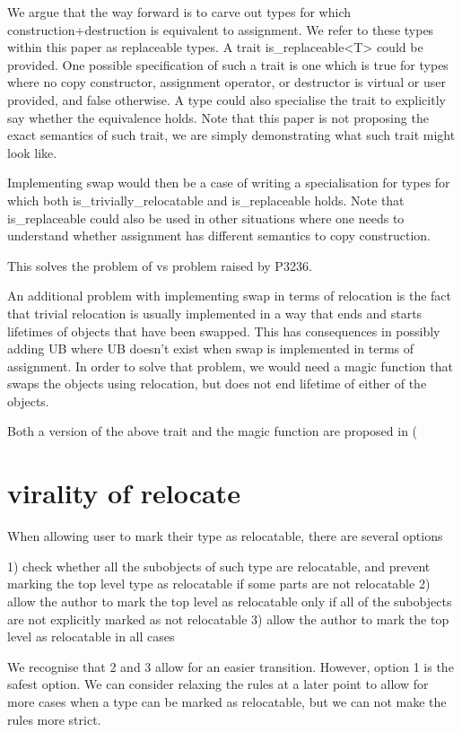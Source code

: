 \documentclass{wg21}
\begin{document}
We argue that the way forward is to carve out types for which construction+destruction is equivalent to assignment. We refer to these types within this paper as replaceable types. A trait is_replaceable<T> could be provided. One possible specification of such a trait is one which is true for types where no copy constructor, assignment operator, or destructor is virtual or user provided, and false otherwise. A type could also specialise the trait to explicitly say whether the equivalence holds. Note that this paper is not proposing the exact semantics of such trait, we are simply demonstrating what such trait might look like.


Implementing swap would then be a case of writing a specialisation for types for which both is_trivially_relocatable and is_replaceable holds. Note that is_replaceable could also be used in other situations where one needs to understand whether assignment has different semantics to copy construction.

This solves the problem of  vs  problem raised by P3236.

An additional problem with implementing swap in terms of relocation is the fact that trivial relocation is usually implemented in a way that ends and starts lifetimes of objects that have been swapped. This has consequences in possibly adding UB where UB doesn't exist when swap is implemented in terms of assignment. In order to solve that problem, we would need a magic function that swaps the objects using relocation, but does not end lifetime of either of the objects.

Both a version of the above trait and the magic function are proposed in (%


\section{virality of relocate}

When allowing user to mark their type as relocatable, there are several options

1) check whether all the subobjects of such type are relocatable, and prevent marking the top level type as relocatable if some parts are not relocatable
2) allow the author to mark the top level as relocatable only if all of the subobjects are not explicitly marked as not relocatable
3) allow the author to mark the top level as relocatable in all cases

We recognise that 2 and 3 allow for an easier transition. However, option 1 is the safest option. We can consider relaxing the rules at a later point to allow for more cases when a type can be marked as relocatable, but we can not make the rules more strict.
\end{document}

